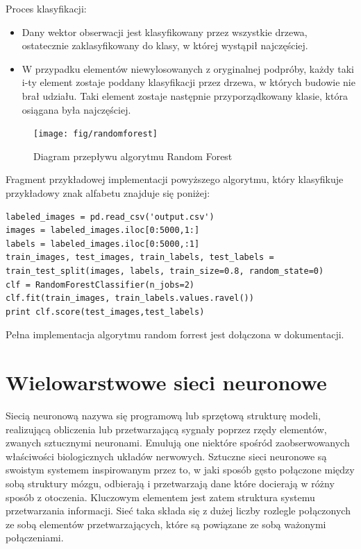 \documentclass[brudnopis]{xmgr}
\begin{document}
Proces klasyfikacji:
\begin{itemize}
\item
Dany wektor obserwacji jest klasyfikowany przez wszystkie drzewa, ostatecznie zaklasyfikowany do klasy, w której wystąpił najczęściej.
\item
W przypadku elementów niewylosowanych z oryginalnej podpróby, każdy taki i-ty element zostaje poddany klasyfikacji przez drzewa, w których budowie nie brał udziału. Taki element zostaje następnie przyporządkowany klasie, która osiągana była najczęściej.
\end{itemize}

\begin{figure}[!tbh]
\centering
\texttt{[image: fig/randomforest]}
\caption{Diagram przepływu algorytmu Random Forest}
\end{figure}
\newpage

Fragment przykładowej implementacji powyższego algorytmu, który klasyfikuje przykładowy znak alfabetu znajduje się poniżej:

\begin{lstlisting}
labeled_images = pd.read_csv('output.csv')
images = labeled_images.iloc[0:5000,1:]
labels = labeled_images.iloc[0:5000,:1]
train_images, test_images, train_labels, test_labels = train_test_split(images, labels, train_size=0.8, random_state=0)
clf = RandomForestClassifier(n_jobs=2)
clf.fit(train_images, train_labels.values.ravel())
print clf.score(test_images,test_labels)
\end{lstlisting}

Pełna implementacja algorytmu random forrest jest dołączona w dokumentacji.

\section{Wielowarstwowe sieci neuronowe}

Siecią neuronową nazywa się programową lub sprzętową strukturę modeli, realizującą obliczenia lub przetwarzającą sygnały poprzez rzędy elementów, zwanych sztucznymi neuronami. Emulują one niektóre spośród zaobserwowanych właściwości biologicznych układów nerwowych. Sztuczne sieci neuronowe są swoistym systemem inspirowanym przez to, w jaki sposób gęsto połączone między sobą struktury mózgu, odbierają i przetwarzają dane które docierają w różny sposób z otoczenia. Kluczowym elementem jest zatem struktura systemu przetwarzania informacji. Sieć taka składa się z dużej liczby rozlegle połączonych ze sobą elementów przetwarzających, które są powiązane ze sobą ważonymi połączeniami.
\end{document}
